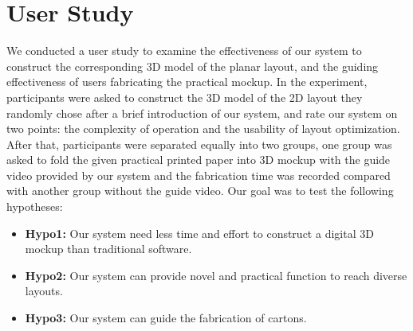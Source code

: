 \section{User Study}
We conducted a user study to examine the effectiveness of our system to construct the corresponding 3D model of the planar layout, and the guiding effectiveness of users fabricating the practical mockup. In the experiment, participants were asked to construct the 3D model of the 2D layout they randomly chose after a brief introduction of our system, and rate our system on two points: the complexity of operation and the usability of layout optimization. After that, participants were separated equally into two groups, one group was asked to fold the given practical printed paper into 3D mockup with the guide video provided by our system and the fabrication time was recorded compared with another group without the guide video. Our goal was to test the following hypotheses:

\begin{itemize}
	\item \textbf{Hypo1:} Our system need less time and effort to construct a digital 3D mockup than traditional software.
	\item \textbf{Hypo2:} Our system can provide novel and practical function to reach diverse layouts.
	\item \textbf{Hypo3:} Our system can guide the fabrication of cartons.
\end{itemize}